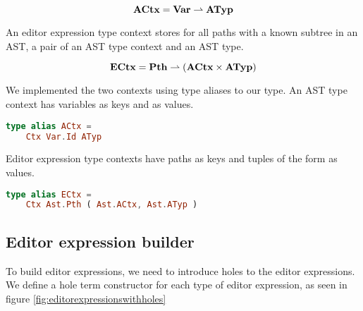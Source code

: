 \begin{equation}\label{eq:actx}
    \textbf{ACtx} = \textbf{Var} \rightharpoonup \textbf{ATyp}
\end{equation}

An editor expression type context stores for all paths with a known subtree in
an AST, a pair of an AST type context and an AST type.

\begin{equation}\label{eq:ectx}
    \textbf{ECtx} = \textbf{Pth} \rightharpoonup (\textbf{ACtx} \times \textbf{ATyp})
\end{equation}

We implemented the two contexts using type aliases to our  type. An
AST type context has variables as keys and  as values.

\begin{lstlisting}[language=elm,%
                   gobble=0,%
                   caption={Equation (\ref{eq:actx}) modeled in Elm},%
                   ]
type alias ACtx =
    Ctx Var.Id ATyp
\end{lstlisting}

Editor expression type contexts have paths as keys and tuples of the form
 as values.

\begin{lstlisting}[language=elm,%
                   gobble=0,%
                   caption={Equation (\ref{eq:ectx}) modeled in Elm},%
                   ]
type alias ECtx =
    Ctx Ast.Pth ( Ast.ACtx, Ast.ATyp )
\end{lstlisting}

\subsection{Editor expression builder}

To build editor expressions, we need to introduce holes to the editor
expressions. We define a hole term constructor for each type of editor
expression, as seen in figure \ref{fig:editorexpressionswithholes}

